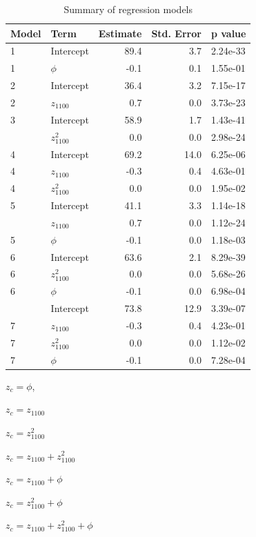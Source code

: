 \documentclass[draft,linenumbers]{agujournal2018}
\begin{document}
\begin{table}

\caption{\label{tab:reg.summary}Summary of regression models}
\centering
\fontsize{8}{10}\selectfont
\begin{threeparttable}
\begin{tabular}[t]{llrrl}
\toprule
Model & Term & Estimate & Std. Error & p value\\
\midrule
1 & Intercept & 89.4 & 3.7 & 2.24e-33\\
1 & $\phi$ & -0.1 & 0.1 & 1.55e-01\\
2 & Intercept & 36.4 & 3.2 & 7.15e-17\\
2 & $z_{1100}$ & 0.7 & 0.0 & 3.73e-23\\
3 & Intercept & 58.9 & 1.7 & 1.43e-41\\
\addlinespace
3 & $z_{1100}^2$ & 0.0 & 0.0 & 2.98e-24\\
4 & Intercept & 69.2 & 14.0 & 6.25e-06\\
4 & $z_{1100}$ & -0.3 & 0.4 & 4.63e-01\\
4 & $z_{1100}^2$ & 0.0 & 0.0 & 1.95e-02\\
5 & Intercept & 41.1 & 3.3 & 1.14e-18\\
\addlinespace
5 & $z_{1100}$ & 0.7 & 0.0 & 1.12e-24\\
5 & $\phi$ & -0.1 & 0.0 & 1.18e-03\\
6 & Intercept & 63.6 & 2.1 & 8.29e-39\\
6 & $z_{1100}^2$ & 0.0 & 0.0 & 5.68e-26\\
6 & $\phi$ & -0.1 & 0.0 & 6.98e-04\\
\addlinespace
7 & Intercept & 73.8 & 12.9 & 3.39e-07\\
7 & $z_{1100}$ & -0.3 & 0.4 & 4.23e-01\\
7 & $z_{1100}^2$ & 0.0 & 0.0 & 1.12e-02\\
7 & $\phi$ & -0.1 & 0.0 & 7.28e-04\\
\bottomrule
\end{tabular}
\begin{tablenotes}
\item[1] $z_c=\phi$,
\item[2] $z_c=z_{1100}$
\item[3] $z_c=z_{1100}^2$
\item[4] $z_c=z_{1100}+z_{1100}^2$
\item[5] $z_c=z_{1100}+\phi$
\item[6] $z_c=z_{1100}^2+\phi$
\item[7] $z_c=z_{1100}+z_{1100}^2+\phi$
\end{tablenotes}
\end{threeparttable}
\end{table}
\end{document}

